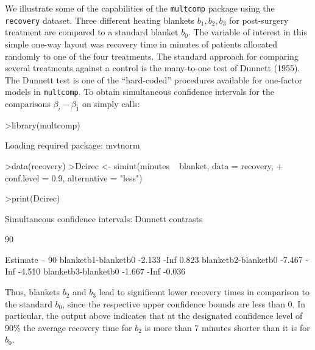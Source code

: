 \documentclass{article}
\begin{document}
We illustrate some of the capabilities of the \texttt{multcomp}
package using the \texttt{recovery} dataset. Three
different heating blankets $b_1, b_2, b_3$ for post-surgery
treatment are compared to a standard blanket $b_0$. The variable
of interest in this simple one-way layout was recovery time in
minutes of patients allocated randomly to one of the four
treatments. The standard approach for comparing several treatments
against a control is the many-to-one test of Dunnett (1955). The
Dunnett test is one of the ``hard-coded'' procedures available for
one-factor models in \texttt{multcomp}. To obtain simultaneous
confidence intervals for the comparisons $\beta_i - \beta_1$ on
simply calls:
\small
\begin{Schunk}
\begin{Sinput}
>library(multcomp)
\end{Sinput}
\begin{Soutput}
Loading required package: mvtnorm 
\end{Soutput}
\begin{Sinput}
>data(recovery)
>Dcirec <- simint(minutes ~ blanket, data = recovery, 
+     conf.level = 0.9, alternative = "less")
\end{Sinput}
\end{Schunk}
\begin{Schunk}
\begin{Sinput}
>print(Dcirec)
\end{Sinput}
\begin{Soutput}
	Simultaneous confidence intervals: Dunnett
	contrasts

	90 % confidence intervals

                    Estimate   --   90 %
blanketb1-blanketb0   -2.133 -Inf  0.823
blanketb2-blanketb0   -7.467 -Inf -4.510
blanketb3-blanketb0   -1.667 -Inf -0.036
\end{Soutput}
\end{Schunk}
\normalsize
Thus, blankets $b_2$ and $b_3$ lead to significant lower recovery
times in comparison to the standard $b_0$, since the respective
upper confidence bounds are less than 0. In particular, the output
above indicates that at the designated confidence level of 90\%
the average recovery time for $b_2$ is more than 7 minutes shorter
than it is for $b_0$.
\end{document}
